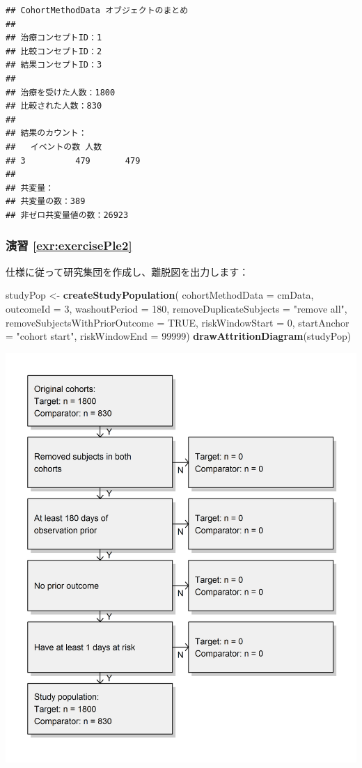 \documentclass[
  11pt]{book}
\newenvironment{Shaded}{\begin{snugshade}}{\end{snugshade}}
\newcommand{\AttributeTok}[1]{\textcolor[rgb]{0.13,0.29,0.53}{#1}}
\newcommand{\ConstantTok}[1]{\textcolor[rgb]{0.56,0.35,0.01}{#1}}
\newcommand{\DecValTok}[1]{\textcolor[rgb]{0.00,0.00,0.81}{#1}}
\newcommand{\FunctionTok}[1]{\textcolor[rgb]{0.13,0.29,0.53}{\textbf{#1}}}
\newcommand{\NormalTok}[1]{#1}
\newcommand{\OtherTok}[1]{\textcolor[rgb]{0.56,0.35,0.01}{#1}}
\newcommand{\StringTok}[1]{\textcolor[rgb]{0.31,0.60,0.02}{#1}}
\theoremstyle{definition}
\theoremstyle{definition}
\theoremstyle{definition}
\theoremstyle{definition}
\theoremstyle{remark}
\begin{document}
\begin{verbatim}
## CohortMethodData オブジェクトのまとめ
## 
## 治療コンセプトID：1
## 比較コンセプトID：2
## 結果コンセプトID：3
## 
## 治療を受けた人数：1800
## 比較された人数：830
## 
## 結果のカウント：
##   イベントの数 人数
## 3          479       479
## 
## 共変量：
## 共変量の数：389
## 非ゼロ共変量値の数：26923
\end{verbatim}

\subsubsection*{演習 \ref{exr:exercisePle2}}\label{ux6f14ux7fd2-refexrexerciseple2}

仕様に従って研究集団を作成し、離脱図を出力します：

\begin{Shaded}
\begin{Highlighting}[]
\NormalTok{studyPop }\OtherTok{\textless{}{-}} \FunctionTok{createStudyPopulation}\NormalTok{(}
  \AttributeTok{cohortMethodData =}\NormalTok{ cmData,}
  \AttributeTok{outcomeId =} \DecValTok{3}\NormalTok{,}
  \AttributeTok{washoutPeriod =} \DecValTok{180}\NormalTok{,}
  \AttributeTok{removeDuplicateSubjects =} \StringTok{"remove all"}\NormalTok{,}
  \AttributeTok{removeSubjectsWithPriorOutcome =} \ConstantTok{TRUE}\NormalTok{,}
  \AttributeTok{riskWindowStart =} \DecValTok{0}\NormalTok{,}
  \AttributeTok{startAnchor =} \StringTok{"cohort start"}\NormalTok{,}
  \AttributeTok{riskWindowEnd =} \DecValTok{99999}\NormalTok{)}
\FunctionTok{drawAttritionDiagram}\NormalTok{(studyPop)}
\end{Highlighting}
\end{Shaded}

\begin{center}\includegraphics[width=0.8\linewidth]{images/SuggestedAnswers/attrition} \end{center}
\end{document}
